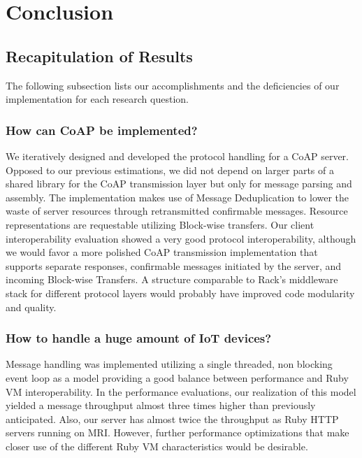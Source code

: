 \chapter{Conclusion}
\label{cha:conclusion}

\section{Recapitulation of Results}

	The following subsection lists our accomplishments and the deficiencies of
	our implementation for each research question.

	\subsection*{How can \ac{CoAP} be implemented?}

		We iteratively designed and developed the protocol handling for a
		\ac{CoAP} server. Opposed to our previous estimations, we did not
		depend on larger parts of a shared library for the \ac{CoAP}
		transmission layer but only for message parsing and assembly. The
		implementation makes use of Message Deduplication to lower the waste of
		server resources through retransmitted confirmable messages. Resource
		representations are requestable utilizing Block-wise transfers. Our
		client interoperability evaluation showed a very good protocol
		interoperability, although we would favor a more polished \ac{CoAP}
		transmission implementation that supports separate responses,
		confirmable messages initiated by the server, and incoming Block-wise
		Transfers. A structure comparable to Rack's middleware stack for
		different protocol layers would probably have improved code modularity
		and quality.

	\subsection*{How to handle a huge amount of \ac{IoT} devices?}

		Message handling was implemented utilizing a single threaded, non
		blocking event loop as a model providing a good balance between
		performance and Ruby \ac{VM} interoperability. In the performance
		evaluations, our realization of this model yielded a message throughput
		almost three times higher than previously anticipated. Also, our server
		has almost twice the throughput as Ruby \ac{HTTP} servers running on
		\ac{MRI}. However, further performance optimizations that make closer
		use of the different Ruby \ac{VM} characteristics would be desirable.

